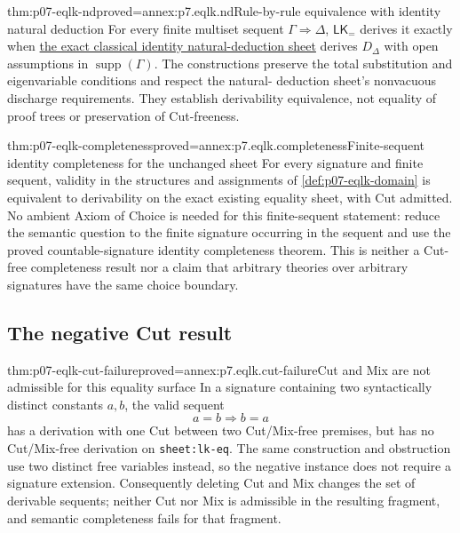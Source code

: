 \begin{hbtheorem}{thm:p07-eqlk-nd}{proved=annex:p7.eqlk.nd}{Rule-by-rule equivalence with identity natural deduction}
For every finite multiset sequent \(\Gamma\Rightarrow\Delta\),
\(\mathsf{LK}_{=}\) derives it exactly when
\hyperref[sheet:nd-fol]{the exact classical identity natural-deduction sheet}
derives \(D_\Delta\) with open assumptions in
\(\operatorname{supp}(\Gamma)\). The constructions preserve the total
substitution and eigenvariable conditions and respect the natural-
deduction sheet's nonvacuous discharge requirements. They establish
derivability equivalence, not equality of proof trees or preservation
of Cut-freeness.
\end{hbtheorem}

\begin{hbtheorem}{thm:p07-eqlk-completeness}{proved=annex:p7.eqlk.completeness}{Finite-sequent identity completeness for the unchanged sheet}
For every signature and finite sequent, validity in the structures and
assignments of \cref{def:p07-eqlk-domain} is equivalent to derivability
on the exact existing equality sheet, with Cut admitted. No ambient
Axiom of Choice is needed for this finite-sequent statement: reduce
the semantic question to the finite signature occurring in the sequent
and use the proved countable-signature identity completeness theorem.
This is neither a Cut-free completeness result nor a claim that
arbitrary theories over arbitrary signatures have the same choice boundary.
\end{hbtheorem}

\subsection{The negative Cut result}

\begin{hbtheorem}{thm:p07-eqlk-cut-failure}{proved=annex:p7.eqlk.cut-failure}{Cut and Mix are not admissible for this equality surface}
In a signature containing two syntactically distinct constants \(a,b\),
the valid sequent
\[
                         a=b\Rightarrow b=a
\]
has a derivation with one Cut between two Cut/Mix-free premises, but
has no Cut/Mix-free derivation on \texttt{sheet:lk-eq}.
The same construction and obstruction use two distinct free variables
instead, so the negative instance does not require a signature extension.
Consequently deleting Cut and Mix changes the set of derivable sequents;
neither Cut nor Mix is admissible in the resulting fragment, and
semantic completeness fails for that fragment.
\end{hbtheorem}

